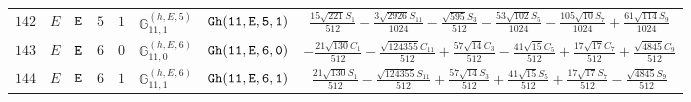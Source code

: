 \documentclass[fleqn,8pt]{jsarticle}
\begin{document}
\begin{table}[ht!]
\begin{center}
\begin{tabular}{cccccccc}
$ 142 $ & $ E $ & $ {\tt E} $ & $ 5 $ & $ 1 $ & $ \mathbb{G}_{11,1}^{(h,E,5)} $ & $ {\tt Gh(11,E,5,1)} $ & $ \frac{15 \sqrt{221} S_{1}}{512} - \frac{3 \sqrt{2926} S_{11}}{1024} - \frac{\sqrt{595} S_{3}}{512} - \frac{53 \sqrt{102} S_{5}}{1024} - \frac{105 \sqrt{10} S_{7}}{1024} + \frac{61 \sqrt{114} S_{9}}{1024} $ \\
$ 143 $ & $ E $ & $ {\tt E} $ & $ 6 $ & $ 0 $ & $ \mathbb{G}_{11,0}^{(h,E,6)} $ & $ {\tt Gh(11,E,6,0)} $ & $ - \frac{21 \sqrt{130} C_{1}}{512} - \frac{\sqrt{124355} C_{11}}{512} + \frac{57 \sqrt{14} C_{3}}{512} - \frac{41 \sqrt{15} C_{5}}{512} + \frac{17 \sqrt{17} C_{7}}{512} + \frac{\sqrt{4845} C_{9}}{512} $ \\
$ 144 $ & $ E $ & $ {\tt E} $ & $ 6 $ & $ 1 $ & $ \mathbb{G}_{11,1}^{(h,E,6)} $ & $ {\tt Gh(11,E,6,1)} $ & $ \frac{21 \sqrt{130} S_{1}}{512} - \frac{\sqrt{124355} S_{11}}{512} + \frac{57 \sqrt{14} S_{3}}{512} + \frac{41 \sqrt{15} S_{5}}{512} + \frac{17 \sqrt{17} S_{7}}{512} - \frac{\sqrt{4845} S_{9}}{512} $ \\
 \hline \hline
\end{tabular}
\end{center}
\end{table}
\end{document}
